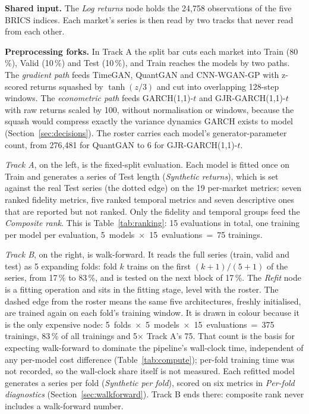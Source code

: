 \documentclass[11pt,a4paper]{article}
\makeatletter
\DeclareRobustCommand{\_}{\ifmmode\nfss@text{\textunderscore}\else\textunderscore\allowbreak\fi}
\makeatother
\begin{document}
\textbf{Shared input.} The \emph{Log returns} node holds the 24,758 observations of the five BRICS indices. Each market's series is then read by two tracks that never read from each other.

\textbf{Preprocessing forks.} In Track A the split bar cuts each market into Train (80\,\%), Valid (10\,\%) and Test (10\,\%), and Train reaches the models by two paths. The \emph{gradient path} feeds TimeGAN, QuantGAN and CNN-WGAN-GP with z-scored returns squashed by $\tanh(z/3)$ and cut into overlapping 128-step windows. The \emph{econometric path} feeds GARCH(1,1)-$t$ and GJR-GARCH(1,1)-$t$ with raw returns scaled by 100, without normalisation or windows, because the squash would compress exactly the variance dynamics GARCH exists to model (Section~\ref{sec:decisions}). The roster carries each model's generator-parameter count, from 276,481 for QuantGAN to 6 for GJR-GARCH(1,1)-$t$.

\emph{Track A}, on the left, is the fixed-split evaluation. Each model is fitted once on Train and generates a series of Test length (\emph{Synthetic returns}), which is set against the real Test series (the dotted edge) on the 19 per-market metrics: seven ranked fidelity metrics, five ranked temporal metrics and seven descriptive ones that are reported but not ranked. Only the fidelity and temporal groups feed the \emph{Composite rank}. This is Table~\ref{tab:ranking}: 15 evaluations in total, one training per model per evaluation, 5~models~$\times$~15~evaluations~=~75 trainings.

\emph{Track B}, on the right, is walk-forward. It reads the full series (train, valid and test) as 5 expanding folds: fold $k$ trains on the first $(k+1)/(5+1)$ of the series, from 17\,\% to 83\,\%, and is tested on the next block of 17\,\%. The \emph{Refit} node is a fitting operation and sits in the fitting stage, level with the roster. The dashed edge from the roster means the same five architectures, freshly initialised, are trained again on each fold's training window. It is drawn in colour because it is the only expensive node: 5~folds~$\times$~5~models~$\times$~15~evaluations~=~375 trainings, 83\,\% of all trainings and 5$\times$ Track A's 75. That count is the basis for expecting walk-forward to dominate the pipeline's wall-clock time, independent of any per-model cost difference (Table~\ref{tab:compute}); per-fold training time was not recorded, so the wall-clock share itself is not measured. Each refitted model generates a series per fold (\emph{Synthetic per fold}), scored on six metrics in \emph{Per-fold diagnostics} (Section~\ref{sec:walkforward}). Track B ends there: composite rank never includes a walk-forward number.
\end{document}
